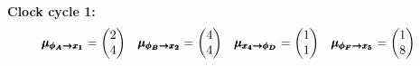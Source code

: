 \begin{exenumerate}
\begin{solution}
    { \bf Clock cycle 1:}\\
    \begin{align}
      \pmb{\mu_{{\phi_A\rightarrow x_1}}} & = \begin{pmatrix}
        2 \\
        4 \\
      \end{pmatrix}
      & 
      \pmb{\mu_{{\phi_B\rightarrow x_2}}} & = \begin{pmatrix}
        4 \\
        4 \\
      \end{pmatrix}
      &
      \pmb{\mu_{{x_4\rightarrow \phi_D}}} & = \begin{pmatrix}
        1 \\
        1 \\
      \end{pmatrix}
      &
      \pmb{\mu_{{\phi_F\rightarrow x_5}}} & = \begin{pmatrix}
        1 \\
        8 \\
      \end{pmatrix}
    \end{align}
    

\end{solution}
\end{exenumerate}
